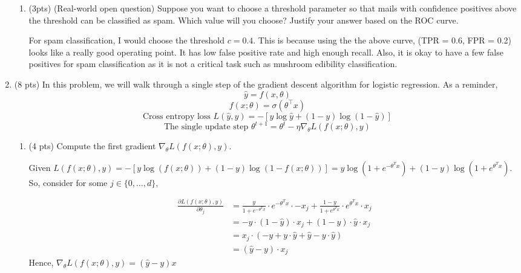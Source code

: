 \documentclass[a4paper]{article}
\theoremstyle{definition}
\newenvironment{soln}{
    \leavevmode\color{blue}\ignorespaces
}{}
\begin{document}
\begin{enumerate}
\begin{enumerate}
	\item (3pts) (Real-world open question) Suppose you want to choose a threshold parameter so that mails with confidence positives above the threshold can be classified as spam. Which value will you choose? Justify your answer based on the ROC curve.
	
	\begin{soln}  For spam classification, I would choose the threshold $c = 0.4$. This is because using the the above curve, (\textsf{TPR} = 0.6, \textsf{FPR} = 0.2)  looks like a really good operating point. It has low false positive rate and high enough recall. Also, it is okay to have a few false positives for spam classification as it is not a critical task such as mushroom edibility classification.\end{soln}
\end{enumerate}

\item (8 pts) In this problem, we will walk through a single step of the gradient descent algorithm for logistic regression. As a reminder,
$$\hat{y} = f(x, \theta)$$
$$f(x;\theta) = \sigma(\theta^\top x)$$
$$\text{Cross entropy loss } L(\hat{y}, y) = -[y \log  \hat{y} + (1-y)\log(1-\hat{y})]$$
$$\text{The single update step } \theta^{t+1} = \theta^{t} - \eta \nabla_{\theta} L(f(x;\theta), y) $$



\begin{enumerate}
	\item (4 pts) Compute the first gradient $\nabla_{\theta} L(f(x;\theta), y)$.
	
	\begin{soln}
    Given $L(f(x;\theta), y) = -[y \log(f(x;\theta)) + (1-y) \log(1 - f(x;\theta))] = y \log\left(1 + e^{-\theta^T x} \right) + (1-y) \log \left( 1 + e^{\theta^T x} \right)$.
    So, consider for some $j \in \{0, \hdots, d\}$,

    \begin{align*}
        \frac{\partial L(f(x; \theta), y)}{\partial \theta_j} &= \frac{y}{1 + e^{-\theta^T x}} \cdot e^{-\theta^T x} \cdot -x_j + \frac{1-y}{1 + e^{\theta^T x}} \cdot e^{\theta^T x} \cdot x_j \\
        &= - y \cdot (1 - \hat{y}) \cdot x_j + (1 - y) \cdot \hat{y} \cdot x_j \\
        &= x_j \cdot (-y + y \cdot \hat{y} + \hat{y} - y \cdot \hat{y}) \\
        &= (\hat{y} - y) \cdot x_j
    \end{align*}
    Hence, $\nabla_\theta L(f(x; \theta), y) = (\hat{y} - y) x$
    \end{soln}
	

\end{enumerate}
\end{enumerate}
\end{document}

